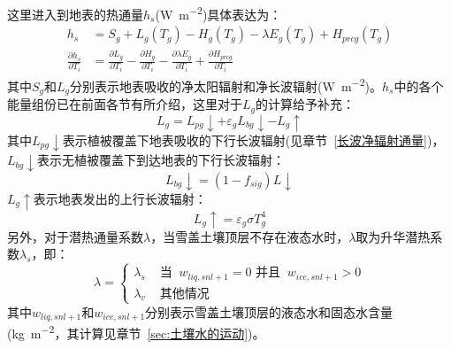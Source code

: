 这里进入到地表的热通量$h_s$(\unit{W.m^{-2}})具体表达为：
\begin{equation}
\begin{aligned}
h_{s} &= S_{g}+L_{g}\left(T_{g}\right)-H_{g}\left(T_{g}\right)-\lambda E_{g}\left(T_{g}\right)+H_{p r c g}\left(T_{g}\right) \\
\frac{\partial h_{s}}{\partial T_{i}} &= \frac{\partial L_{g}}{\partial T_{i}}-\frac{\partial H_{g}}{\partial T_{i}}-\frac{\partial \lambda E_{g}}{\partial T_{i}}+\frac{\partial H_{p r c g}}{\partial T_{i}}
\end{aligned}
\end{equation}
其中$S_g$和$L_g$分别表示地表吸收的净太阳辐射和净长波辐射(\unit{W.m^{-2}})。$h_s$中的各个能量组份已在前面各节有所介绍，这里对于$L_g$的计算给予补充：
\begin{equation}
L_{g}=L_{p g} \downarrow+\varepsilon_{g} L_{b g} \downarrow-L_{g} \uparrow
\end{equation}
其中$L_{pg}\downarrow$表示植被覆盖下地表吸收的下行长波辐射(见章节~\ref{长波净辐射通量})，$L_{bg}\downarrow$表示无植被覆盖下到达地表的下行长波辐射：
\begin{equation}
L_{b g} \downarrow=\left(1-f_{ sig }\right) L \downarrow
\end{equation}
$L_g\uparrow$表示地表发出的上行长波辐射：
\begin{equation}
L_{g} \uparrow=\varepsilon_{g} \sigma T_{g}^{4}
\end{equation}
另外，对于潜热通量系数$\lambda$，当雪盖土壤顶层不存在液态水时，$\lambda$取为升华潜热系数$\lambda_s$，即：
\begin{equation}
\lambda=\left\{\begin{array}{lr}\lambda_{s} & \text { 当 }\ w_{liq, s n l+1}=0 \text { 并且 }\ w_{ice, s n l+1}>0 \\ \lambda_{v} & \text { 其他情况 }\end{array}\right.
\end{equation}
其中$w_{liq,snl+1}$和$w_{ice,snl+1}$分别表示雪盖土壤顶层的液态水和固态水含量 (\unit{kg.m^{-2}}，其计算见章节~\ref{sec:土壤水的运动})。

